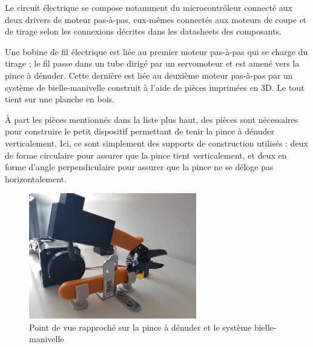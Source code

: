 \par Le circuit électrique se compose notamment du microcontrôleur connecté aux deux drivers de moteur pas-à-pas, eux-mêmes connectés aux moteurs de coupe et de tirage selon les connexions décrites dans les datasheets des composants.
\par Une bobine de fil électrique est liée au premier moteur pas-à-pas qui se charge du tirage ; le fil passe dans un tube dirigé par un servomoteur et est amené vers la pince à dénuder. Cette dernière est liée au deuxième moteur pas-à-pas par un système de bielle-manivelle construit à l'aide de pièces imprimées en 3D. Le tout tient sur une planche en bois.
\par À part les pièces mentionnés dans la liste plus haut, des pièces sont nécessaires pour construire le petit dispositif permettant de tenir la pince à dénuder verticalement. Ici, ce sont simplement des supports de construction utilisés : deux de forme circulaire pour assurer que la pince tient verticalement, et deux en forme d'angle perpendiculaire pour assurer que la pince ne se déloge pas horizontalement.

\begin{figure}[H]
    \centering
    \includegraphics[width=0.65\textwidth]{images/proto2.jpg}
    \caption{Point de vue rapproché sur la pince à dénuder et le système bielle-manivelle}
    \label{fig:proto2}
\end{figure}